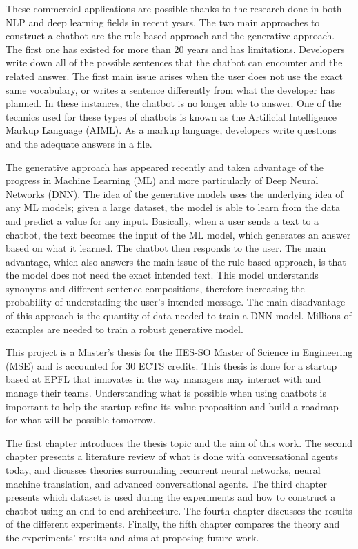 These commercial applications are possible thanks to the research done in both NLP and deep learning fields in recent years. The two main approaches to construct a chatbot are the rule-based approach and the generative approach.
The first one has existed for more than 20 years and has limitations. Developers write down all of the possible sentences that the chatbot can encounter and the related answer. The first main issue arises when the user does not use the exact same vocabulary, or writes a sentence differently from what the developer has planned. In these instances, the chatbot is no longer able to answer.
One of the technics used for these types of chatbots is known as the Artificial Intelligence Markup Language (AIML). As a markup language, developers write questions and the adequate answers in a file.

The generative approach has appeared recently and taken advantage of the progress in Machine Learning (ML) and more particularly of Deep Neural Networks (DNN). The idea of the generative models uses the underlying idea of any ML models; given a large dataset, the model is able to learn from the data and predict a value for any input.
Basically, when a user sends a text to a chatbot, the text becomes the input of the ML model, which generates an answer based on what it learned. The chatbot then responds to the user.
The main advantage, which also answers the main issue of the rule-based approach, is that the model does not need the exact intended text. This model understands synonyms and different sentence compositions, therefore increasing the probability of understading the user's intended message.
The main disadvantage of this approach is the quantity of data needed to train a DNN model. Millions of examples are needed to train a robust generative model.

This project is a Master's thesis for the HES-SO Master of Science in Engineering (MSE) and is accounted for 30 ECTS credits.
This thesis is done for a startup based at EPFL that innovates in the way managers may interact with and manage their teams.
Understanding what is possible when using chatbots is important to help the startup refine its value proposition and build a roadmap for what will be possible tomorrow.

The first chapter introduces the thesis topic and the aim of this work. The second chapter presents a literature review of what is done with conversational agents today, and dicusses theories surrounding recurrent neural networks, neural machine translation, and advanced conversational agents.
The third chapter presents which dataset is used during the experiments and how to construct a chatbot using an end-to-end architecture. The fourth chapter discusses the results of the different experiments.
Finally, the fifth chapter compares the theory and the experiments' results and aims at proposing future work.
